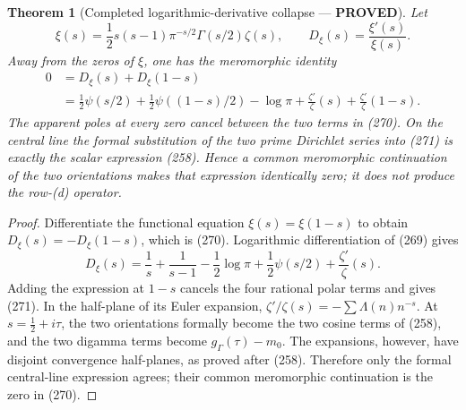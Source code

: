 \documentclass[11pt]{article}
\newtheorem{theorem}{Theorem}
\newcommand{\PROVED}{\textcolor{green!45!black}{\textbf{PROVED}}}
\begin{document}
\begin{theorem}[Completed logarithmic-derivative collapse --- \PROVED]
Let
\begin{equation}
 \xi(s)=\frac12s(s-1)\pi^{-s/2}\Gamma(s/2)\zeta(s),
 \qquad D_\xi(s)=\frac{\xi'(s)}{\xi(s)}.              \tag{269}
\end{equation}
Away from the zeros of $\xi$, one has the meromorphic identity
\begin{align}
 0&=D_\xi(s)+D_\xi(1-s)                              \tag{270}\\
 &=\frac12\psi(s/2)+\frac12\psi((1-s)/2)-\log\pi
   +\frac{\zeta'}{\zeta}(s)
   +\frac{\zeta'}{\zeta}(1-s).                       \tag{271}
\end{align}
The apparent poles at every zero cancel between the two terms in (270).
On the central line the formal substitution of the two prime Dirichlet
series into (271) is exactly the scalar expression (258).  Hence a common
meromorphic continuation of the two orientations makes that expression
identically zero; it does \emph{not} produce the row-(d) operator.
\end{theorem}

\begin{proof}
Differentiate the functional equation $\xi(s)=\xi(1-s)$ to obtain
$D_\xi(s)=-D_\xi(1-s)$, which is (270).  Logarithmic differentiation of
(269) gives
\[
 D_\xi(s)=\frac1s+\frac1{s-1}-\frac12\log\pi
 +\frac12\psi(s/2)+\frac{\zeta'}{\zeta}(s).
\]
Adding the expression at $1-s$ cancels the four rational polar terms and
gives (271).  In the half-plane of its Euler expansion,
$\zeta'/\zeta(s)=-\sum\Lambda(n)n^{-s}$.  At
$s=\tfrac12+i\tau$, the two orientations formally become the two cosine
terms of (258), and the two digamma terms become
$g_\Gamma(\tau)-m_0$.  The expansions, however, have disjoint convergence
half-planes, as proved after (258).  Therefore only the formal central-line
expression agrees; their common meromorphic continuation is the zero in
(270).
\end{proof}
\end{document}
